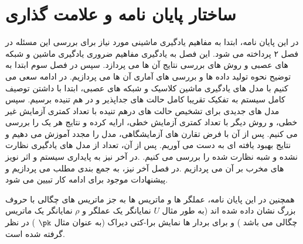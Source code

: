 \section{ساختار پایان نامه و علامت گذاری}





در این پایان نامه، ابتدا به مفاهیم یادگیری ماشینی مورد نیاز برای بررسی این مسئله در فصل ۲ پرداخته می شود. این فصل به یادگیری  مفاهیم ضروری یادگیری ماشین و شبکه های عصبی و روش های بررسی نتایج آن ها می پردازد.
سپس در فصل سوم ابتدا به توضیح نحوه تولید داده ها و بررسی های آماری آن ها می پردازیم. در ادامه سعی می کنیم با مدل های یادگیری ماشین کلاسیک و شبکه های عصبی، ابتدا با داشتن توصیف کامل سیستم به تفکیک تقریبا کامل حالت های جداپذیر و در هم تنیده برسیم. سپس مدل های جدیدی برای تشخیص حالت های درهم تنیده با تعداد کمتری آزمایش غیر خطی، و روش دیگر با تعداد کمتری آزمایش خطی، ارایه کرده و نتایج هر یک را بررسی می کنیم. پس از آن با فرض تقارن های آزمایشگاهی، مدل را مجدد آموزش می دهیم و نتایج بهبود یافته ای به دست می آوریم.
پس از آن، تعداد از مدل های یادگیری نظارت نشده و شبه نظارت شده را بررسی می کنیم.
.در آخر نیز به پایداری سیستم و اثر نویز های مخرب بر آن می پردازیم
.در فصل آخر نیز، به جمع بندی مطلب می پردازیم و پیشنهادات موجود برای ادامه کار تبیین می شود.

همچنین در این پایان نامه، عملگر ها و ماتریس ها به جز ماتریس های چگالی با حروف بزرگ نشان داده شده اند  (به طور مثال
$U$
نمایانگر یک عملگر و
$\rho$
نمایانگر یک ماتریس چگالی می باشد
) و
برای بردار ها نمایش برا-کتی دیراک (به عنوان مثال
$\pk$
) در نظر گرفته شده است.
